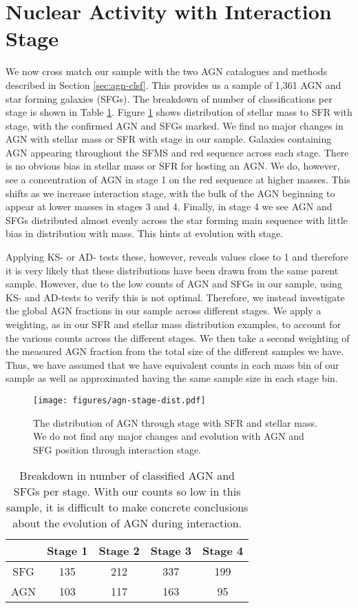 \documentclass[fleqn,usenatbib]{mnras}
\begin{document}
\section{Nuclear Activity with Interaction Stage}
\noindent We now cross match our sample with the two AGN catalogues and methods described in Section \ref{sec:agn-clsf}. This provides us a sample of 1,361 AGN and star forming galaxies (SFGs). The breakdown of number of classifications per stage is shown in Table \ref{tab:agn-sfg-breakdown}. Figure \ref{fig:agn-stage} shows distribution of stellar mass to SFR with stage, with the confirmed AGN and SFGs marked. We find no major changes in AGN with stellar mass or SFR with stage in our sample. Galaxies containing AGN appearing throughout the SFMS and red sequence across each stage. There is no obvious bias in stellar mass or SFR for hosting an AGN. We do, however, see a concentration of AGN in stage 1 on the red sequence at higher masses. This shifts as we increase interaction stage, with the bulk of the AGN beginning to appear at lower masses in stages 3 and 4. Finally, in stage 4 we see AGN and SFGs distributed almost evenly across the star forming main sequence with little bias in distribution with mass. This hints at evolution with stage.

Applying KS- or AD- tests these, however, reveals values close to 1 and therefore it is very likely that these distributions have been drawn from the same parent sample. However, due to the low counts of AGN and SFGs in our sample, using KS- and AD-tests to verify this is not optimal. Therefore, we instead investigate the global AGN fractions in our sample across different stages. We apply a weighting, as in our SFR and stellar mass distribution examples, to account for the various counts across the different stages. We then take a second weighting of the measured AGN fraction from the total size of the different samples we have. Thus, we have assumed that we have equivalent counts in each mass bin of our sample as well as approximated having the same sample size in each stage bin.

\begin{figure}
    \centering
    \texttt{[image: figures/agn-stage-dist.pdf]}
    \caption{The distribution of AGN through stage with SFR and stellar mass. We do not find any major changes and evolution with AGN and SFG position through interaction stage. }
    \label{fig:agn-stage}
\end{figure}

\begin{table}
    \centering
    \begin{tabular}{|c|c|c|c|c|}
         & Stage 1 & Stage 2 & Stage 3 & Stage 4 \\
         \hline
        SFG & 135 & 212 & 337 & 199 \\
        AGN & 103 & 117 & 163 & 95
    \end{tabular}
    \caption{Breakdown in number of classified AGN and SFGs per stage. With our counts so low in this sample, it is difficult to make concrete conclusions about the evolution of AGN during interaction.}
    \label{tab:agn-sfg-breakdown}
\end{table}
\end{document}
